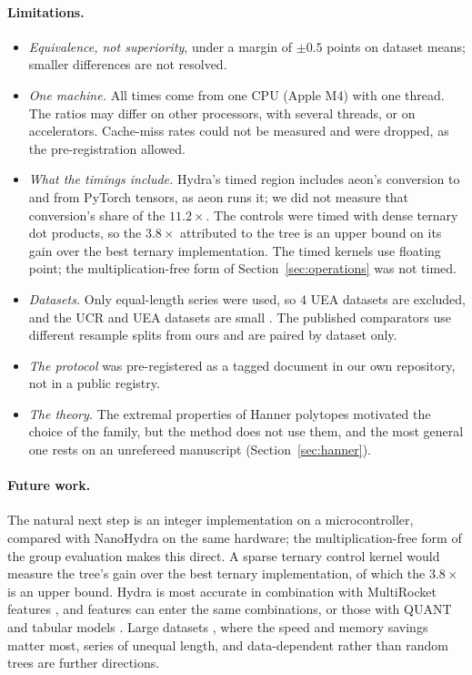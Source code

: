 \paragraph{Limitations.}
\begin{itemize}
\item \emph{Equivalence, not superiority}, under a margin of $\pm0.5$ points on dataset
  means; smaller differences are not resolved.
\item \emph{One machine.} All times come from one CPU (Apple M4) with one thread. The ratios
  may differ on other processors, with several threads, or on accelerators. Cache-miss
  rates could not be measured and were dropped, as the pre-registration allowed.
\item \emph{What the timings include.} Hydra's timed region includes aeon's conversion to
  and from PyTorch tensors, as aeon runs it; we did not measure that conversion's share of
  the $11.2\times$. The controls were timed with dense ternary dot products, so the
  $3.8\times$ attributed to the tree is an upper bound on its gain over the best ternary
  implementation. The timed kernels use floating point; the multiplication-free form of
  Section~\ref{sec:operations} was not timed.
\item \emph{Datasets.} Only equal-length series were used, so 4 UEA datasets are excluded,
  and the UCR and UEA datasets are small \citep{dempster2025monster}. The published
  comparators use different resample splits from ours and are paired by dataset only.
\item \emph{The protocol} was pre-registered as a tagged document in our own repository,
  not in a public registry.
\item \emph{The theory.} The extremal properties of Hanner polytopes motivated the choice
  of the family, but the method does not use them, and the most general one rests on an
  unrefereed manuscript (Section~\ref{sec:hanner}).
\end{itemize}

\paragraph{Future work.} The natural next step is an integer implementation on a
microcontroller, compared with NanoHydra \citep{cioflan2025nanohydra} on the same hardware;
the multiplication-free form of the group evaluation makes this direct. A sparse ternary
control kernel would measure the tree's gain over the best ternary implementation, of
which the $3.8\times$ is an upper bound. Hydra is most
accurate in combination with MultiRocket features \citep{middlehurst2024bakeoff}, and
\hh{} features can enter the same combinations, or those with QUANT and tabular models
\citep{maniar2025metalearning,orourke2026rocketpfn}. Large datasets
\citep{dempster2025monster}, where the speed and memory savings matter most, series of
unequal length, and data-dependent rather than random trees are further directions.

